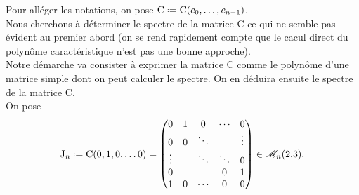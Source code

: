 \begin{preuve}
    Pour alléger les notations, on pose $\mathrm{C} \defeq \mathrm{C}(c_0, \dots, c_{n-1})$. \\
    Nous cherchons à déterminer le spectre de la matrice $\mathrm{C}$ ce qui ne semble pas évident au premier abord (on se rend rapidement compte que le cacul direct du polynôme caractéristique n'est pas une bonne approche). \\
    Notre démarche va consister à exprimer la matrice $\mathrm{C}$ comme le polynôme d'une matrice simple dont on peut calculer le spectre. On en déduira ensuite le spectre de la matrice $\mathrm{C}$. \\
    On pose 
    $$
    \mathrm{J}_n \defeq \mathrm{C}(0, 1, 0, \dots 0) = 
    \begin{pmatrix}
    0 & 1 & 0 & \cdots & 0 \\
    0 & 0 & \ddots & & \vdots \\
    \vdots & & \ddots & \ddots & 0 \\
    0 & & & 0 & 1 \\
    1 & 0 & \cdots & 0 & 0
    \end{pmatrix} \in \M_n(\R).
    $$
    

\end{preuve}
